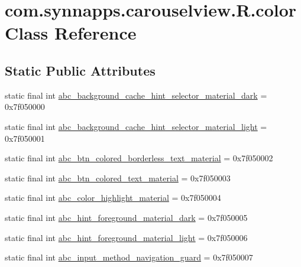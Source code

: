 \hypertarget{classcom_1_1synnapps_1_1carouselview_1_1_r_1_1color}{}\section{com.\+synnapps.\+carouselview.\+R.\+color Class Reference}
\label{classcom_1_1synnapps_1_1carouselview_1_1_r_1_1color}
\subsection*{Static Public Attributes}
\begin{DoxyCompactItemize}
\item 
static final int \mbox{\hyperlink{classcom_1_1synnapps_1_1carouselview_1_1_r_1_1color_a1e84c501f99098abc790929f3fdf56b6}{abc\+\_\+background\+\_\+cache\+\_\+hint\+\_\+selector\+\_\+material\+\_\+dark}} = 0x7f050000
\item 
static final int \mbox{\hyperlink{classcom_1_1synnapps_1_1carouselview_1_1_r_1_1color_ae2c3ab944484fe74fd4c60e965af5ca6}{abc\+\_\+background\+\_\+cache\+\_\+hint\+\_\+selector\+\_\+material\+\_\+light}} = 0x7f050001
\item 
static final int \mbox{\hyperlink{classcom_1_1synnapps_1_1carouselview_1_1_r_1_1color_aa6f81e22b7a2220866dd8a5316ecc7d5}{abc\+\_\+btn\+\_\+colored\+\_\+borderless\+\_\+text\+\_\+material}} = 0x7f050002
\item 
static final int \mbox{\hyperlink{classcom_1_1synnapps_1_1carouselview_1_1_r_1_1color_a33241e9b35950fd58e654a333334f01b}{abc\+\_\+btn\+\_\+colored\+\_\+text\+\_\+material}} = 0x7f050003
\item 
static final int \mbox{\hyperlink{classcom_1_1synnapps_1_1carouselview_1_1_r_1_1color_a0bd97e07e210d1770cfa18e595692a41}{abc\+\_\+color\+\_\+highlight\+\_\+material}} = 0x7f050004
\item 
static final int \mbox{\hyperlink{classcom_1_1synnapps_1_1carouselview_1_1_r_1_1color_a4fd527a798b4063a5cddf00f6545e7e4}{abc\+\_\+hint\+\_\+foreground\+\_\+material\+\_\+dark}} = 0x7f050005
\item 
static final int \mbox{\hyperlink{classcom_1_1synnapps_1_1carouselview_1_1_r_1_1color_ac77dbcfb4cc3a696996dd325fc2cf017}{abc\+\_\+hint\+\_\+foreground\+\_\+material\+\_\+light}} = 0x7f050006
\item 
static final int \mbox{\hyperlink{classcom_1_1synnapps_1_1carouselview_1_1_r_1_1color_a3b4f1c59c65451f4f31fe7376373fa7c}{abc\+\_\+input\+\_\+method\+\_\+navigation\+\_\+guard}} = 0x7f050007

\end{DoxyCompactItemize}
